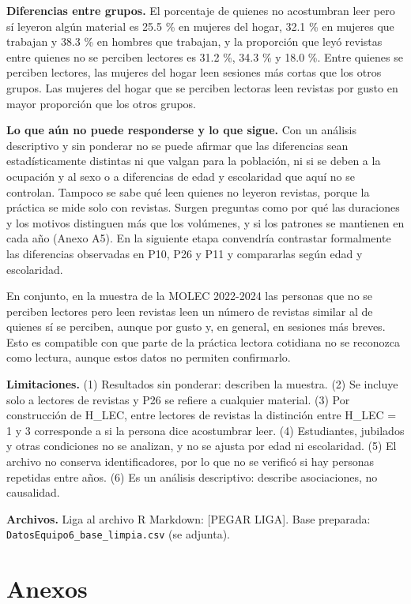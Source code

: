 \documentclass[
  spanish,
  12pt,
]{extarticle}
\begin{document}
\textbf{Diferencias entre grupos.} El porcentaje de quienes no
acostumbran leer pero sí leyeron algún material es 25.5 \% en mujeres
del hogar, 32.1 \% en mujeres que trabajan y 38.3 \% en hombres que
trabajan, y la proporción que leyó revistas entre quienes no se perciben
lectores es 31.2 \%, 34.3 \% y 18.0 \%. Entre quienes se perciben
lectores, las mujeres del hogar leen sesiones más cortas que los otros
grupos. Las mujeres del hogar que se perciben lectoras leen revistas por
gusto en mayor proporción que los otros grupos.

\textbf{Lo que aún no puede responderse y lo que sigue.} Con un análisis
descriptivo y sin ponderar no se puede afirmar que las diferencias sean
estadísticamente distintas ni que valgan para la población, ni si se
deben a la ocupación y al sexo o a diferencias de edad y escolaridad que
aquí no se controlan. Tampoco se sabe qué leen quienes no leyeron
revistas, porque la práctica se mide solo con revistas. Surgen preguntas
como por qué las duraciones y los motivos distinguen más que los
volúmenes, y si los patrones se mantienen en cada año (Anexo A5). En la
siguiente etapa convendría contrastar formalmente las diferencias
observadas en P10, P26 y P11 y compararlas según edad y escolaridad.

En conjunto, en la muestra de la MOLEC 2022-2024 las personas que no se
perciben lectores pero leen revistas leen un número de revistas similar
al de quienes sí se perciben, aunque por gusto y, en general, en
sesiones más breves. Esto es compatible con que parte de la práctica
lectora cotidiana no se reconozca como lectura, aunque estos datos no
permiten confirmarlo.

\textbf{Limitaciones.} (1) Resultados sin ponderar: describen la
muestra. (2) Se incluye solo a lectores de revistas y P26 se refiere a
cualquier material. (3) Por construcción de H\_LEC, entre lectores de
revistas la distinción entre H\_LEC = 1 y 3 corresponde a si la persona
dice acostumbrar leer. (4) Estudiantes, jubilados y otras condiciones no
se analizan, y no se ajusta por edad ni escolaridad. (5) El archivo no
conserva identificadores, por lo que no se verificó si hay personas
repetidas entre años. (6) Es un análisis descriptivo: describe
asociaciones, no causalidad.

\textbf{Archivos.} Liga al archivo R Markdown: {[}PEGAR LIGA{]}. Base
preparada: \texttt{DatosEquipo6\_base\_limpia.csv} (se adjunta).

\newpage

\section{Anexos}\label{anexos}
\end{document}
